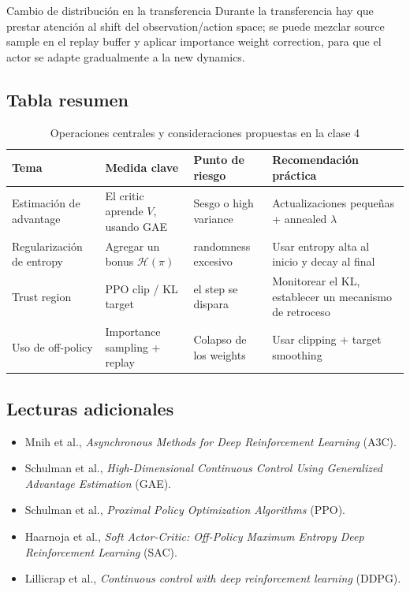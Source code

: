 \documentclass[a4paper]{article}
\begin{document}
\begin{knowledgebox}{Cambio de distribución en la transferencia}
Durante la transferencia hay que prestar atención al shift del observation/action space; se puede mezclar source sample en el replay buffer y aplicar importance weight correction, para que el actor se adapte gradualmente a la new dynamics.
\end{knowledgebox}

\subsection{Tabla resumen}

\begin{table}[H]
\centering
\begin{tabular}{p{}p{}p{}p{}}
\toprule
Tema & Medida clave & Punto de riesgo & Recomendación práctica \\
\midrule
Estimación de advantage & El critic aprende $V$, usando GAE & Sesgo o high variance & Actualizaciones pequeñas + annealed $\lambda$ \\
Regularización de entropy & Agregar un bonus $\mathcal{H}(\pi)$ & randomness excesivo & Usar entropy alta al inicio y decay al final \\
Trust region & PPO clip / KL target & el step se dispara & Monitorear el KL, establecer un mecanismo de retroceso \\
Uso de off-policy & Importance sampling + replay & Colapso de los weights & Usar clipping + target smoothing \\
\bottomrule
\end{tabular}
\caption{Operaciones centrales y consideraciones propuestas en la clase 4}
\end{table}

\subsection{Lecturas adicionales}
\begin{itemize}
    \item Mnih et al., \textit{Asynchronous Methods for Deep Reinforcement Learning} (A3C).
    \item Schulman et al., \textit{High-Dimensional Continuous Control Using Generalized Advantage Estimation} (GAE).
    \item Schulman et al., \textit{Proximal Policy Optimization Algorithms} (PPO).
    \item Haarnoja et al., \textit{Soft Actor-Critic: Off-Policy Maximum Entropy Deep Reinforcement Learning} (SAC).
    \item Lillicrap et al., \textit{Continuous control with deep reinforcement learning} (DDPG).
\end{itemize}
\end{document}
